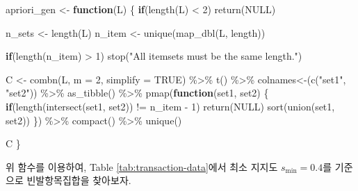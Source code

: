 \documentclass[
]{book}
\newenvironment{Shaded}{\begin{snugshade}}{\end{snugshade}}
\newcommand{\AttributeTok}[1]{\textcolor[rgb]{0.77,0.63,0.00}{#1}}
\newcommand{\ConstantTok}[1]{\textcolor[rgb]{0.00,0.00,0.00}{#1}}
\newcommand{\ControlFlowTok}[1]{\textcolor[rgb]{0.13,0.29,0.53}{\textbf{#1}}}
\newcommand{\DecValTok}[1]{\textcolor[rgb]{0.00,0.00,0.81}{#1}}
\newcommand{\FunctionTok}[1]{\textcolor[rgb]{0.00,0.00,0.00}{#1}}
\newcommand{\NormalTok}[1]{#1}
\newcommand{\OtherTok}[1]{\textcolor[rgb]{0.56,0.35,0.01}{#1}}
\newcommand{\SpecialCharTok}[1]{\textcolor[rgb]{0.00,0.00,0.00}{#1}}
\newcommand{\StringTok}[1]{\textcolor[rgb]{0.31,0.60,0.02}{#1}}
\begin{document}
\begin{Shaded}
\begin{Highlighting}[]
\NormalTok{apriori\_gen }\OtherTok{\textless{}{-}} \ControlFlowTok{function}\NormalTok{(L) \{}
  \ControlFlowTok{if}\NormalTok{(}\FunctionTok{length}\NormalTok{(L) }\SpecialCharTok{\textless{}} \DecValTok{2}\NormalTok{) }\FunctionTok{return}\NormalTok{(}\ConstantTok{NULL}\NormalTok{)}
  
\NormalTok{  n\_sets }\OtherTok{\textless{}{-}} \FunctionTok{length}\NormalTok{(L)}
\NormalTok{  n\_item }\OtherTok{\textless{}{-}} \FunctionTok{unique}\NormalTok{(}\FunctionTok{map\_dbl}\NormalTok{(L, length))}

  \ControlFlowTok{if}\NormalTok{(}\FunctionTok{length}\NormalTok{(n\_item) }\SpecialCharTok{\textgreater{}} \DecValTok{1}\NormalTok{) }\FunctionTok{stop}\NormalTok{(}\StringTok{"All itemsets must be the same length."}\NormalTok{)}
  
\NormalTok{  C }\OtherTok{\textless{}{-}} \FunctionTok{combn}\NormalTok{(L, }\AttributeTok{m =} \DecValTok{2}\NormalTok{, }\AttributeTok{simplify =} \ConstantTok{TRUE}\NormalTok{) }\SpecialCharTok{\%\textgreater{}\%}
    \FunctionTok{t}\NormalTok{() }\SpecialCharTok{\%\textgreater{}\%}
    \StringTok{\textasciigrave{}}\AttributeTok{colnames\textless{}{-}}\StringTok{\textasciigrave{}}\NormalTok{(}\FunctionTok{c}\NormalTok{(}\StringTok{"set1"}\NormalTok{, }\StringTok{"set2"}\NormalTok{)) }\SpecialCharTok{\%\textgreater{}\%}
    \FunctionTok{as\_tibble}\NormalTok{() }\SpecialCharTok{\%\textgreater{}\%}
    \FunctionTok{pmap}\NormalTok{(}\ControlFlowTok{function}\NormalTok{(set1, set2) \{}
      \ControlFlowTok{if}\NormalTok{(}\FunctionTok{length}\NormalTok{(}\FunctionTok{intersect}\NormalTok{(set1, set2)) }\SpecialCharTok{!=}\NormalTok{ n\_item }\SpecialCharTok{{-}} \DecValTok{1}\NormalTok{) }\FunctionTok{return}\NormalTok{(}\ConstantTok{NULL}\NormalTok{)}
      \FunctionTok{sort}\NormalTok{(}\FunctionTok{union}\NormalTok{(set1, set2))}
\NormalTok{      \}) }\SpecialCharTok{\%\textgreater{}\%} 
    \FunctionTok{compact}\NormalTok{() }\SpecialCharTok{\%\textgreater{}\%}
    \FunctionTok{unique}\NormalTok{()}

\NormalTok{  C  }
\NormalTok{\}}
\end{Highlighting}
\end{Shaded}

위 함수를 이용하여, Table \ref{tab:transaction-data}에서 최소 지지도 \(s_{\text{min}} = 0.4\)를 기준으로 빈발항목집합을 찾아보자.
\end{document}

